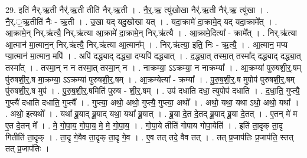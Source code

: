 \documentclass[17pt]{extarticle}
\begin{document}
29. इति॑ नैर्.ऋ॒ती नैर्॑.ऋ॒ती तीति॑ नैर्.ऋ॒ती । . नै॒र्॒.ऋ॒ त्यु॑खोखा नैर्॑.ऋ॒ती नैर्॑.ऋ॒ त्यु॑खा । . नै॒र्.॒ऋ॒तीति॑ नैः - ऋ॒ती । . उ॒खा यद् यदु॒खोखा यत् । . यदा॒क्रामे॑ दा॒क्रामे॒द् यद् यदा॒क्रामे᳚त् । . आ॒क्रामे॒न् निर्.ऋ॑त्यै॒ निर्.ऋ॑त्या आ॒क्रामे॑ दा॒क्रामे॒न् निर्.ऋ॑त्यै । . आ॒क्रामे॒दित्या᳚ - क्रामे᳚त् । . निर्.ऋ॑त्या आ॒त्मान॑ मा॒त्मान॒न् निर्.ऋ॑त्यै॒ निर्.ऋ॑त्या आ॒त्मान᳚म् । . निर्.ऋ॑त्या॒ इति॒ निः - ऋ॒त्यै॒ । . आ॒त्मान॒ मप्य प्या॒त्मान॑ मा॒त्मान॒ मपि॑ । . अपि॑ दद्ध्याद् दद्ध्या॒ दप्यपि॑ दद्ध्यात् । . द॒द्ध्या॒त् तस्मा॒त् तस्मा᳚द् दद्ध्याद् दद्ध्या॒त् तस्मा᳚त् । . तस्मा॒न् न न तस्मा॒त् तस्मा॒न् न । . नाक्रम्या॒ ऽऽक्रम्या॒ न नाक्रम्या᳚ । . आ॒क्रम्या॑ पुरुषशी॒र्॒.षम् पु॑रुषशी॒र्॒.ष मा॒क्रम्या॒ ऽऽक्रम्या॑ पुरुषशी॒र्॒.षम् । . आ॒क्रम्येत्या᳚ - क्रम्या᳚ । . पु॒रु॒ष॒शी॒र्॒.ष मुपोप॑ पुरुषशी॒र्॒.षम् पु॑रुषशी॒र्॒.ष मुप॑ । . पु॒रु॒ष॒शी॒र्॒.षमिति॑ पुरुष - शी॒र्॒.षम् । . उप॑ दधाति दधा॒ त्युपोप॑ दधाति । . द॒धा॒ति॒ गुप्त्यै॒ गुप्त्यै॑ दधाति दधाति॒ गुप्त्यै᳚ । . गुप्त्या॒ अथो॒ अथो॒ गुप्त्यै॒ गुप्त्या॒ अथो᳚ । . अथो॒ यथा॒ यथा ऽथो॒ अथो॒ यथा᳚ । . अथो॒ इत्यथो᳚ । . यथा᳚ ब्रू॒याद् ब्रू॒याद् यथा॒ यथा᳚ ब्रू॒यात् । . ब्रू॒या दे॒त दे॒तद् ब्रू॒याद् ब्रू॒या दे॒तत् । . ए॒तन् मे॑ म ए॒त दे॒तन् मे᳚ । . मे॒ गो॒पा॒य॒ गो॒पा॒य॒ मे॒ मे॒ गो॒पा॒य॒ । . गो॒पा॒ये तीति॑ गोपाय गोपा॒येति॑ । . इति॑ ता॒दृक् ता॒दृ गितीति॑ ता॒दृक् । . ता॒दृ गे॒वैव ता॒दृक् ता॒दृ गे॒व । . ए॒व तत् तदे॒ वैव तत् । . तत् प्र॒जाप॑तिः प्र॒जाप॑ति॒ स्तत् तत् प्र॒जाप॑तिः । \newline
\end{document}
